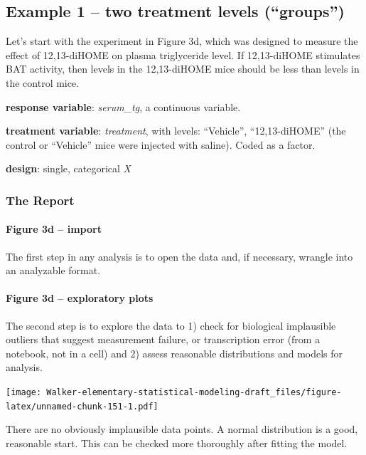 \documentclass[]{book}
\let\oldparagraph\paragraph
\renewcommand{\paragraph}[1]{\oldparagraph{#1}\mbox{}}
\begin{document}
\hypertarget{example-1-two-treatment-levels-groups}{%
\subsection{Example 1 -- two treatment levels (``groups'')}\label{example-1-two-treatment-levels-groups}}

Let's start with the experiment in Figure 3d, which was designed to measure the effect of 12,13-diHOME on plasma triglyceride level. If 12,13-diHOME stimulates BAT activity, then levels in the 12,13-diHOME mice should be less than levels in the control mice.

\textbf{response variable}: \emph{serum\_tg}, a continuous variable.

\textbf{treatment variable}: \emph{treatment}, with levels: ``Vehicle'', ``12,13-diHOME'' (the control or ``Vehicle'' mice were injected with saline). Coded as a factor.

\textbf{design}: single, categorical \emph{X}

\hypertarget{the-report}{%
\subsubsection{The Report}\label{the-report}}

\hypertarget{figure-3d-import}{%
\paragraph{Figure 3d -- import}\label{figure-3d-import}}

The first step in any analysis is to open the data and, if necessary, wrangle into an analyzable format.

\hypertarget{figure-3d-exploratory-plots}{%
\paragraph{Figure 3d -- exploratory plots}\label{figure-3d-exploratory-plots}}

The second step is to explore the data to 1) check for biological implausible outliers that suggest measurement failure, or transcription error (from a notebook, not in a cell) and 2) assess reasonable distributions and models for analysis.

\texttt{[image: Walker-elementary-statistical-modeling-draft\_files/figure-latex/unnamed-chunk-151-1.pdf]}

There are no obviously implausible data points. A normal distribution is a good, reasonable start. This can be checked more thoroughly after fitting the model.
\end{document}
